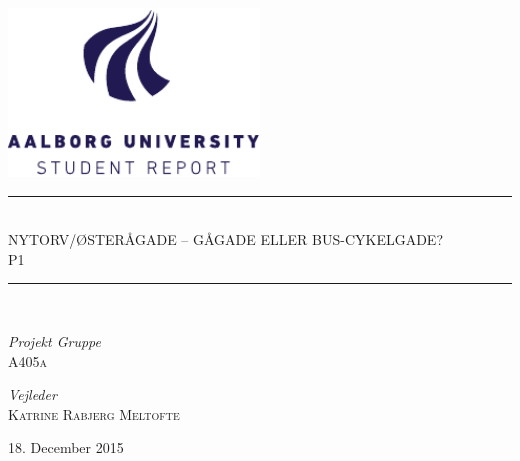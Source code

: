 %
%
%
%
%
\begin{titlepage}
	\begin{center}
		\newcommand{\HRule}{\rule{\linewidth}{0.5mm}}

		\includegraphics[width=0.5\textwidth]{figures/aau_logo_en.pdf}~\\[1cm]



		\HRule \\[0.4cm]
		{ \huge NYTORV/ØSTERÅGADE – GÅGADE ELLER BUS-CYKELGADE?\\[0.4cm]
			\large \textsc{P1}}

		\HRule \\[1.5cm]

		\begin{minipage}{0.4\textwidth}
			\begin{flushleft} \large
				\emph{Projekt Gruppe}\\
				\textsc{A405a}
			\end{flushleft}
		\end{minipage}
		\begin{minipage}{0.4\textwidth}
			\begin{flushright} \large
				\emph{Vejleder} \\
				\textsc{Katrine Rabjerg Meltofte}
			\end{flushright}
		\end{minipage}

		\vfill

		{\large 18. December 2015}
		
	\end{center}
\end{titlepage}

\clearpage
